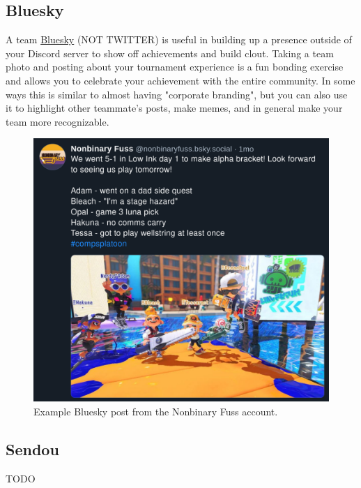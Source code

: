 \documentclass[12pt]{article}
\begin{document}
\subsection{Bluesky}
A team \href{https://bsky.app}{Bluesky} (NOT TWITTER) is useful in building up a presence outside of your Discord server to show off achievements and build clout. Taking a team photo and posting about your tournament experience is a fun bonding exercise and allows you to celebrate your achievement with the entire community. In some ways this is similar to almost having "corporate branding", but you can also use it to highlight other teammate's posts, make memes, and in general make your team more recognizable. 
\begin{figure}
    \centering
    \includegraphics[width=0.75\linewidth]{bluesky.png}
\caption{Example Bluesky post from the Nonbinary Fuss account.}
\end{figure}

\subsection{Sendou}
TODO
\end{document}
